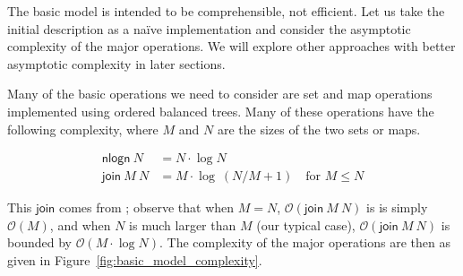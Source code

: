 \documentclass{article}
\newcommand{\order}[1]{\mathcal{O}\left(#1\right)}
\numberwithin{equation}{lemma}
\begin{document}
The basic model is intended to be comprehensible, not efficient. Let us take the
initial description as a na\"ive implementation and consider the asymptotic
complexity of the major operations. We will explore other approaches with
better asymptotic complexity in later sections.

Many of the basic operations we need to consider are set and map operations
implemented using ordered balanced trees. Many of these operations have the
following complexity, where $M$ and $N$ are the sizes of the two sets or maps.

\begin{equation*}
\begin{split}
\mathsf{nlogn} ~ N & = N \cdot \log N \\
\mathsf{join} ~ M ~ N & = M \cdot \log ~ (N/M + 1) \quad \text{for } M \leq N
\end{split}
\end{equation*}

This $\mathsf{join}$ comes from \cite{join_bound}; observe that when $M = N$,
$\order{\mathsf{join} ~ M ~ N}$ is is simply $\order{M}$, and when $N$ is much
larger than $M$ (our typical case), $\order{\mathsf{join} ~ M ~ N}$ is bounded
by $\order{M \cdot \log N}$. The complexity of the major operations are then as
given in Figure~\ref{fig:basic_model_complexity}.
\end{document}

